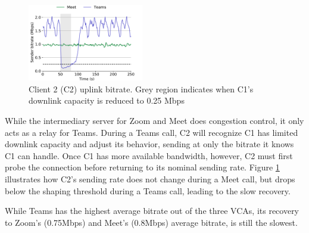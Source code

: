 \begin{figure}[t]
    \centering
    \includegraphics[width=0.45\textwidth,keepaspectratio]{../figures/interrupt/Interrupt-sender.pdf}
    \caption{Client 2 (C2) uplink bitrate. Grey region indicates when C1's downlink capacity is reduced to 0.25 Mbps}
    \label{fig:interrupt-sender}
\end{figure}

While the intermediary server for Zoom and Meet does congestion control, it only acts as a relay for Teams. During a Teams call, C2 will recognize C1 has limited downlink capacity and adjust its behavior, sending at only the bitrate it knows C1 can handle. Once C1 has more available bandwidth, however, C2 must first probe the connection before returning to its nominal sending rate. Figure \ref{fig:interrupt-sender} illustrates how C2's sending rate does not change during a Meet call, but drops below the shaping threshold during a Teams call, leading to the slow recovery.

While Teams has the highest average bitrate out of the three VCAs, its recovery to Zoom's (0.75Mbps) and Meet's (0.8Mbps) average bitrate, is still the slowest. 








